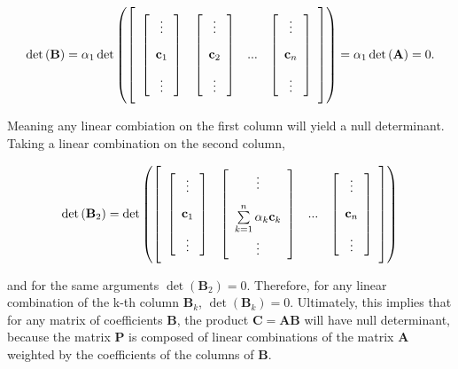 \begin{equation}  \det\left(\mathbf{B}\right) =  \alpha_1\det\left( \left[\raisebox{15mm}{} \begin{array}{cccc} \left[\begin{array}{c} \vdots \\[3mm] \mathbf{c}_1 \\[3mm] \vdots \end{array}\right] & \left[\begin{array}{c} \vdots \\[3mm] \mathbf{c}_2 \\[3mm] \vdots \end{array}\right] & ... & \left[\begin{array}{c} \vdots \\[3mm] \mathbf{c}_n \\[3mm] \vdots \end{array}\right]\end{array}\right]\right) = \alpha_1\det\left(\mathbf{A}\right) = 0. \end{equation}

	Meaning any linear combiation on the first column will yield a null determinant. Taking a linear combination on the second column,

\begin{equation} \det\left(\mathbf{B}_2\right) = \det\left( \left[\raisebox{15mm}{} \begin{array}{cccc} \left[\begin{array}{c} \vdots \\[3mm] \mathbf{c}_1 \\[3mm] \vdots \end{array}\right] & \left[\begin{array}{c} \vdots \\[3mm] \sum\limits_{k=1}^n \alpha_k\mathbf{c}_k \\[3mm] \vdots \end{array}\right] & ... & \left[\begin{array}{c} \vdots \\[3mm] \mathbf{c}_n \\[3mm] \vdots \end{array}\right]\end{array}\right]\right) \end{equation}

	\noindent and for the same arguments $\det\left(\mathbf{B}_2\right) = 0$. Therefore, for any linear combination of the k-th column $\mathbf{B}_k$, $\det\left(\mathbf{B}_k\right) = 0$. Ultimately, this implies that for any matrix of coefficients $\mathbf{B}$, the product $\mathbf{C = AB}$ will have null determinant, because the matrix $\mathbf{P}$ is composed of linear combinations of the matrix $\mathbf{A}$ weighted by the coefficients of the columns of $\mathbf{B}$.

